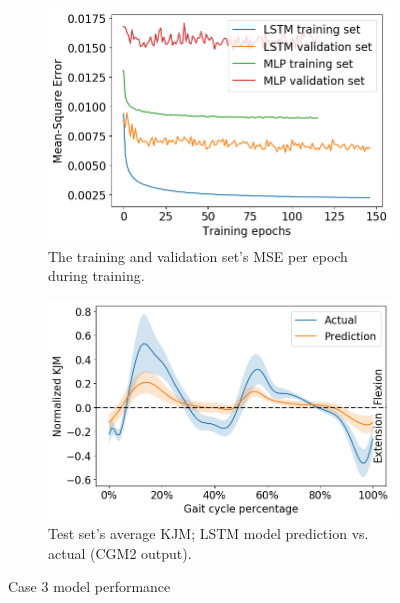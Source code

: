 \documentclass[../main.tex]{subfiles}
\begin{document}
\begin{figure}[!htb]
     \centering
     \begin{subfigure}[b]{0.475\textwidth}
         \centering
         \includegraphics[width=\textwidth]{img/results/training_history/Case3_LSTMvsMLP_training.png}
         \caption{The training and validation set's \ac{MSE} per epoch during training.}
         \label{fig:case3-training-performance}
     \end{subfigure}
     \hfill
     \begin{subfigure}[b]{0.515\textwidth}
         \centering
         \includegraphics[width=\textwidth]{img/results/test_prediction_evaluation/Case3_LSTM_test_prediction.png}
         \caption{Test set's average \ac{KJM}; LSTM model prediction vs. actual (CGM2 output).}
         \label{fig:case3-prediction-performance}
     \end{subfigure}
    \caption{Case 3 model performance}
    \label{fig:case3-performance-plots}
\end{figure}

\end{document}
